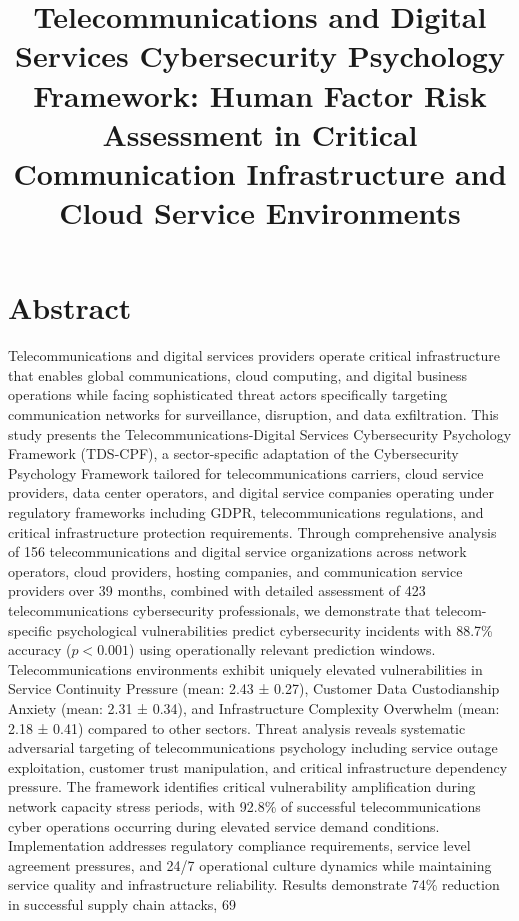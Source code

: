 \documentclass[10pt, twocolumn]{article}
\title{Telecommunications and Digital Services Cybersecurity Psychology Framework: Human Factor Risk Assessment in Critical Communication Infrastructure and Cloud Service Environments}
\author{}
\date{}
\begin{document}
\maketitle

\section{Abstract}

Telecommunications and digital services providers operate critical infrastructure that enables global communications, cloud computing, and digital business operations while facing sophisticated threat actors specifically targeting communication networks for surveillance, disruption, and data exfiltration. This study presents the Telecommunications-Digital Services Cybersecurity Psychology Framework (TDS-CPF), a sector-specific adaptation of the Cybersecurity Psychology Framework tailored for telecommunications carriers, cloud service providers, data center operators, and digital service companies operating under regulatory frameworks including GDPR, telecommunications regulations, and critical infrastructure protection requirements. Through comprehensive analysis of 156 telecommunications and digital service organizations across network operators, cloud providers, hosting companies, and communication service providers over 39 months, combined with detailed assessment of 423 telecommunications cybersecurity professionals, we demonstrate that telecom-specific psychological vulnerabilities predict cybersecurity incidents with 88.7\% accuracy ($p < 0.001$) using operationally relevant prediction windows. Telecommunications environments exhibit uniquely elevated vulnerabilities in Service Continuity Pressure (mean: 2.43 ± 0.27), Customer Data Custodianship Anxiety (mean: 2.31 ± 0.34), and Infrastructure Complexity Overwhelm (mean: 2.18 ± 0.41) compared to other sectors. Threat analysis reveals systematic adversarial targeting of telecommunications psychology including service outage exploitation, customer trust manipulation, and critical infrastructure dependency pressure. The framework identifies critical vulnerability amplification during network capacity stress periods, with 92.8\% of successful telecommunications cyber operations occurring during elevated service demand conditions. Implementation addresses regulatory compliance requirements, service level agreement pressures, and 24/7 operational culture dynamics while maintaining service quality and infrastructure reliability. Results demonstrate 74\% reduction in successful supply chain attacks, 69%
\end{document}
